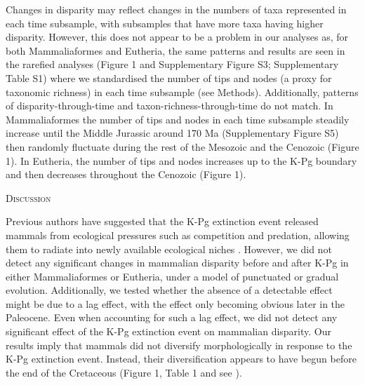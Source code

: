 \documentclass[12pt,letterpaper]{article}
\renewcommand{\section}[1]{%
\bigskip
\begin{center}
\begin{Large}
\normalfont\scshape #1
\medskip
\end{Large}
\end{center}}
\begin{document}
Changes in disparity may reflect changes in the numbers of taxa represented in each time subsample, with subsamples that have more taxa having higher disparity. 
However, this does not appear to be a problem in our analyses as, for both Mammaliaformes and Eutheria, the same patterns and results are seen in the rarefied analyses (Figure 1 and Supplementary Figure S3; Supplementary Table S1) where we standardised the number of tips and nodes (a proxy for taxonomic richness) in each time subsample (see Methods).
Additionally, patterns of disparity-through-time and taxon-richness-through-time do not match.
In Mammaliaformes the number of tips and nodes in each time subsample steadily increase until the Middle Jurassic around 170 Ma (Supplementary Figure S5) then randomly fluctuate during the rest of the Mesozoic and the Cenozoic (Figure 1).
In Eutheria, the number of tips and nodes increases up to the K-Pg boundary and then decreases throughout the Cenozoic (Figure 1).

%
%

\section{Discussion}
Previous authors have suggested that the K-Pg extinction event released mammals from ecological pressures such as competition and predation, allowing them to radiate into newly available ecological niches \cite{archibald2011extinction,OLeary08022013,Lovergrove,Slater2012MEE}.
However, we did not detect any significant changes in mammalian disparity before and after K-Pg in either Mammaliaformes or Eutheria, under a model of punctuated or gradual evolution.
Additionally, we tested whether the absence of a detectable effect might be due to a lag effect, with the effect only becoming obvious later in the Paleocene.
Even when accounting for such a lag effect, we did not detect any significant effect of the K-Pg extinction event on mammalian disparity.
Our results imply that mammals did not diversify morphologically in response to the K-Pg extinction event.
Instead, their diversification appears to have begun before the end of the Cretaceous (Figure 1, Table 1 and see \cite{meredithimpacts2011,dosReis2014,Close2015,Lee2015R759}).
\end{document}

